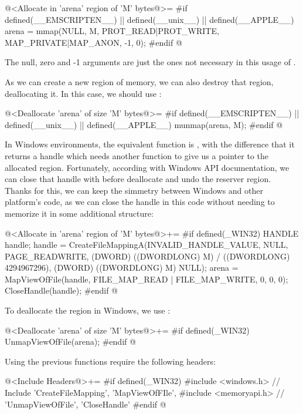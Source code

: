 \iniciocodigo
@<Allocate in 'arena' region of 'M' bytes@>=
#if defined(__EMSCRIPTEN__) || defined(__unix__) || defined(__APPLE__)
arena = mmap(NULL, M, PROT_READ|PROT_WRITE, MAP_PRIVATE|MAP_ANON,
             -1, 0);
#endif
@
\fimcodigo

The null, zero and -1 arguments are just the ones not necessary in
this usage of .

As we can create a new region of memory, we can also destroy that
region, deallocating it. In this case, we should
use :

\iniciocodigo
@<Deallocate 'arena' of size 'M' bytes@>=
#if defined(__EMSCRIPTEN__) || defined(__unix__) || defined(__APPLE__)
munmap(arena, M);
#endif
@
\fimcodigo

In Windows environments, the equivalent function is 
, with the difference that it returns
a handle which needs another function to give us a pointer to the
allocated region. Fortunately, according with Windows API
documentation, we can close that handle with 
before deallocate and undo the reserver region. Thanks for this, we
can keep the simmetry between Windows and other platform's code, as we
can close the handle in this code without needing to memorize it in
some additional structure:

\iniciocodigo
@<Allocate in 'arena' region of 'M' bytes@>+=
#if defined(_WIN32)
{
  HANDLE handle;
  handle = CreateFileMappingA(INVALID_HANDLE_VALUE, NULL,
                              PAGE_READWRITE,
                              (DWORD) ((DWORDLONG) M) / ((DWORDLONG) 4294967296),
                              (DWORD) ((DWORDLONG) M) %
                              NULL);
  arena = MapViewOfFile(handle, FILE_MAP_READ | FILE_MAP_WRITE, 0, 0, 0);
  CloseHandle(handle);
}
#endif
@
\fimcodigo


To deallocate the region in Windows, we
use :

\iniciocodigo
@<Deallocate 'arena' of size 'M' bytes@>+=
#if defined(_WIN32)
UnmapViewOfFile(arena);
#endif
@
\fimcodigo

Using the previous functions require the following headers:

\iniciocodigo
@<Include Headers@>+=
#if defined(_WIN32)
#include <windows.h>  // Include 'CreateFileMapping', 'MapViewOfFIle',
#include <memoryapi.h> // 'UnmapViewOfFile', 'CloseHandle'
#endif
@
\fimcodigo


